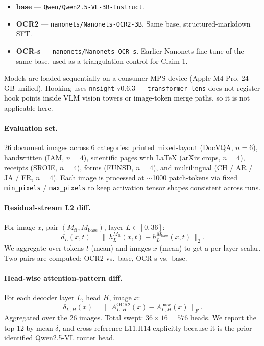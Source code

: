 \documentclass[10pt,twocolumn,letterpaper]{article}
\begin{document}
\begin{itemize}[leftmargin=1.4em,itemsep=0pt,topsep=0pt]
\item \textbf{base} --- \texttt{Qwen/Qwen2.5-VL-3B-Instruct}.
\item \textbf{OCR2} --- \texttt{nanonets/Nanonets-OCR2-3B}. Same base, structured-markdown SFT.
\item \textbf{OCR-s} --- \texttt{nanonets/Nanonets-OCR-s}. Earlier Nanonets fine-tune of the same base, used as a triangulation control for Claim 1.
\end{itemize}

Models are loaded sequentially on a consumer MPS device (Apple M4 Pro, 24 GB unified). Hooking uses \texttt{nnsight} v0.6.3 --- \texttt{transformer\_lens} does not register hook points inside VLM vision towers or image-token merge paths, so it is not applicable here.

\paragraph{Evaluation set.} 26 document images across 6 categories: printed mixed-layout (DocVQA, $n{=}6$), handwritten (IAM, $n{=}4$), scientific pages with LaTeX (arXiv crops, $n{=}4$), receipts (SROIE, $n{=}4$), forms (FUNSD, $n{=}4$), and multilingual (CH / AR / JA / FR, $n{=}4$). Each image is processed at $\sim$1000 patch-tokens via fixed \texttt{min\_pixels} / \texttt{max\_pixels} to keep activation tensor shapes consistent across runs.

\paragraph{Residual-stream L2 diff.} For image $x$, pair $(M_{\text{ft}}, M_{\text{base}})$, layer $L \in [0, 36]$:
\[
d_L(x, t) = \|\,h^{M_{\text{ft}}}_L(x, t) - h^{M_{\text{base}}}_L(x, t)\,\|_2.
\]
We aggregate over tokens $t$ (mean) and images $x$ (mean) to get a per-layer scalar. Two pairs are computed: OCR2 vs.\ base, OCR-s vs.\ base.

\paragraph{Head-wise attention-pattern diff.} For each decoder layer $L$, head $H$, image $x$:
\[
\delta_{L,H}(x) = \|\,A^{\text{OCR2}}_{L,H}(x) - A^{\text{base}}_{L,H}(x)\,\|_F.
\]
Aggregated over the 26 images. Total swept: $36 \times 16 = 576$ heads. We report the top-12 by mean $\delta$, and cross-reference L11.H14 explicitly because it is the prior-identified Qwen2.5-VL router head.
\end{document}
